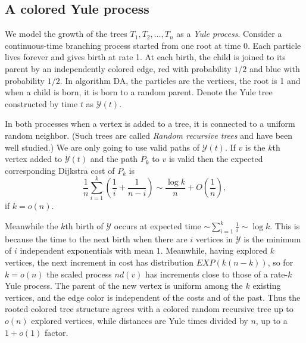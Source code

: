 \documentclass[12pt]{article}
\newcommand{\1}{\textbf{1}}
\newcommand{\bfrac}[2]{\left(\frac{#1}{#2}\right)}
\def\cY{{\mathcal Y}}
\newcommand{\beq}[2]{\begin{equation}\label{#1}#2\end{equation}}
\begin{document}
\subsection{A colored Yule process}
We model the growth of the trees $T_1,T_2,\ldots,T_n$ as a {\em Yule process}. Consider a continuous-time branching process started from one root at time $0$.  Each particle lives forever and gives birth at rate 1. At each birth, the child is joined to its parent by an independently colored edge, red with probability $1/2$ and blue with probability $1/2$. In algorithm DA, the particles are the vertices, the root is 1 and when a child is born, it is born to a random parent. Denote the Yule tree constructed by time $t$ as $\cY(t)$.

In both processes when a vertex is added to a tree, it is connected to a uniform random neighbor. (Such trees are called {\em Random recursive trees} and have been well studied.) We are only going to use valid paths of $\cY(t)$. If $v$ is the $k$th vertex added to $\cY(t)$ and the path $P_k$ to $v$ is valid then the expected corresponding Dijkstra cost of $P_k$ is 
\beq{k(n-k)}{
\frac{1}{n}\sum_{i=1}^k\left(\frac{1}{i}+ \frac{1}{n-i}\right) \sim \frac{\log k}{n}+O\bfrac{1}{n},
}
if $k=o(n)$.

Meanwhile the $k$th birth of $\cY$ occurs at expected time $\sim\sum_{i=1}^k\frac{1}{i}\sim \log k$. This is because the time to the next birth when there are $i$ vertices in $\cY$ is the minimum of $i$ independent exponentials with mean $1$. Meanwhile, having explored $k$ vertices, the next increment in cost has distribution $EXP(k(n-k))$, so for $k = o(n)$ the scaled process $nd(v)$ has increments close to those of a rate-$k$ Yule process. The parent of the new vertex is uniform among the $k$ existing vertices, and the edge color is independent of the costs and of the past. Thus the rooted colored tree structure agrees with a colored random recursive tree up to $o(n)$ explored vertices, while distances are Yule times divided by $n$, up to a $1 + o(1)$ factor.
\end{document}

